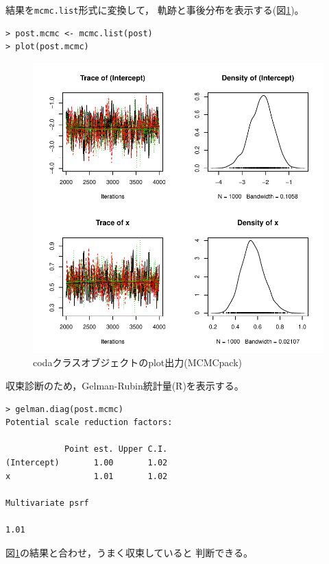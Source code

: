 \documentclass[11pt,uplatex]{jsarticle}
\begin{document}
結果を\texttt{mcmc.list}形式に変換して，
軌跡と事後分布を表示する(図\ref{plot_coda_mcmcpack})。
\begin{lstlisting}
> post.mcmc <- mcmc.list(post)
> plot(post.mcmc)
\end{lstlisting}


\begin{figure}[htbp]
	\begin{center}
		\includegraphics[bb=0 0 400 400, clip, width=300 bp]{example2_results.pdf}
	\end{center}
	\caption{\textsf{coda}クラスオブジェクトのplot出力(MCMCpack)}
	\label{plot_coda_mcmcpack}
\end{figure}

\vspace{3zw}

収束診断のため，Gelman-Rubin統計量(\^R)を表示する。
\begin{lstlisting}
> gelman.diag(post.mcmc)
Potential scale reduction factors:

            Point est. Upper C.I.
(Intercept)       1.00       1.02
x                 1.01       1.02

Multivariate psrf

1.01
\end{lstlisting}
図\ref{plot_coda_mcmcpack}の結果と合わせ，うまく収束していると
判断できる。
\end{document}
